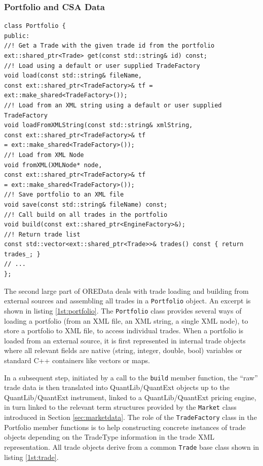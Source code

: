 \documentclass[12pt, a4paper]{report}
\begin{document}
\subsubsection{Portfolio and CSA Data}

\begin{listing}[H]
\begin{verbatim}
class Portfolio {
public:
//! Get a Trade with the given trade id from the portfolio
ext::shared_ptr<Trade> get(const std::string& id) const;
//! Load using a default or user supplied TradeFactory
void load(const std::string& fileName,
const ext::shared_ptr<TradeFactory>& tf = ext::make_shared<TradeFactory>());
//! Load from an XML string using a default or user supplied TradeFactory
void loadFromXMLString(const std::string& xmlString,
const ext::shared_ptr<TradeFactory>& tf
= ext::make_shared<TradeFactory>());
//! Load from XML Node
void fromXML(XMLNode* node,
const ext::shared_ptr<TradeFactory>& tf
= ext::make_shared<TradeFactory>());
//! Save portfolio to an XML file
void save(const std::string& fileName) const;
//! Call build on all trades in the portfolio
void build(const ext::shared_ptr<EngineFactory>&);
//! Return trade list
const std::vector<ext::shared_ptr<Trade>>& trades() const { return trades_; }
// ...
};
\end{verbatim}
\caption{Excerpt of the Portfolio class showing essential member functions.}
\label{1st:portfolio}
\end{listing}

The second large part of OREData deals with trade loading and building from external sources and assembling all trades in a {\tt Portfolio} object. An excerpt is shown in listing \ref{1st:portfolio}. The {\tt Portfolio} class provides several ways of loading a portfolio (from an
XML file, an XML string, a single XML node), to store a portfolio to XML file, to access individual trades. When a portfolio is loaded from an external source, it is first represented in internal trade objects where all relevant fields are native (string, integer, double, bool) variables
or standard C++ containers like vectors or maps.

In a subsequent step, initiated by a call to the {\tt build} member function, the ``raw'' trade data is then translated into QuantLib/QuantExt objects up to the QuantLib/QuantExt instrument, linked to a QuantLib/QuantExt pricing engine, in turn linked to the relevant term structures provided by the {\tt Market} class introduced in Section \ref{sec:marketdata}.
The role of the {\tt TradeFactory} class in the Portfolio member functions is to help constructing concrete instances of trade objects depending on the TradeType information in the trade XML representation.
All trade objects derive from a common {\tt Trade} base class shown in listing \ref{1st:trade}.
\end{document}
